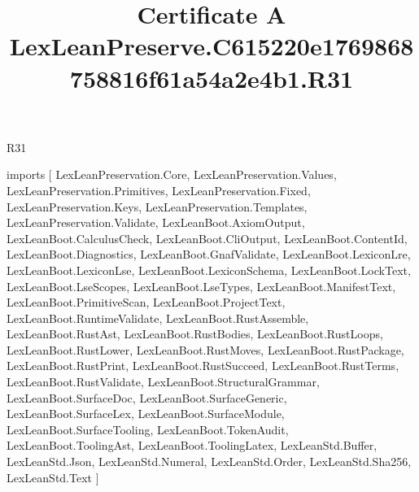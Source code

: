 \begin{lexlean}{R31}
\title{Certificate A LexLeanPreserve.C615220e1769868758816f61a54a2e4b1.R31}
\begin{coremodule}
imports [
  LexLeanPreservation.Core,
  LexLeanPreservation.Values,
  LexLeanPreservation.Primitives,
  LexLeanPreservation.Fixed,
  LexLeanPreservation.Keys,
  LexLeanPreservation.Templates,
  LexLeanPreservation.Validate,
  LexLeanBoot.AxiomOutput,
  LexLeanBoot.CalculusCheck,
  LexLeanBoot.CliOutput,
  LexLeanBoot.ContentId,
  LexLeanBoot.Diagnostics,
  LexLeanBoot.GnafValidate,
  LexLeanBoot.LexiconLre,
  LexLeanBoot.LexiconLse,
  LexLeanBoot.LexiconSchema,
  LexLeanBoot.LockText,
  LexLeanBoot.LseScopes,
  LexLeanBoot.LseTypes,
  LexLeanBoot.ManifestText,
  LexLeanBoot.PrimitiveScan,
  LexLeanBoot.ProjectText,
  LexLeanBoot.RuntimeValidate,
  LexLeanBoot.RustAssemble,
  LexLeanBoot.RustAst,
  LexLeanBoot.RustBodies,
  LexLeanBoot.RustLoops,
  LexLeanBoot.RustLower,
  LexLeanBoot.RustMoves,
  LexLeanBoot.RustPackage,
  LexLeanBoot.RustPrint,
  LexLeanBoot.RustSucceed,
  LexLeanBoot.RustTerms,
  LexLeanBoot.RustValidate,
  LexLeanBoot.StructuralGrammar,
  LexLeanBoot.SurfaceDoc,
  LexLeanBoot.SurfaceGeneric,
  LexLeanBoot.SurfaceLex,
  LexLeanBoot.SurfaceModule,
  LexLeanBoot.SurfaceTooling,
  LexLeanBoot.TokenAudit,
  LexLeanBoot.ToolingAst,
  LexLeanBoot.ToolingLatex,
  LexLeanStd.Buffer,
  LexLeanStd.Json,
  LexLeanStd.Numeral,
  LexLeanStd.Order,
  LexLeanStd.Sha256,
  LexLeanStd.Text
]


\end{coremodule}
\end{lexlean}

